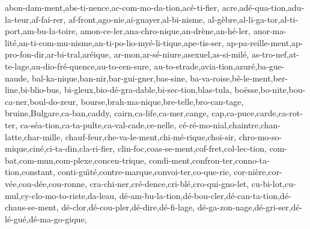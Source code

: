 %
%
abon-dam-ment,abs-ti-nence,ac-com-mo-da-tion,ac\'{e}-ti-fier,%
acre,ad\'{e}-qua-tion,adu-la-teur,af-fai-rer,%
af-front,ago-nie,ai-guayer,al-bi-nisme,%
al-g\`{e}bre,al-li-ga-tor,al-ti-port,am-bu-la-toire,%
amon-ce-ler,ana-chro-nique,an-dr\`{e}ne,an-h\'{e}-ler,%
anor-ma-lit\'{e},an-ti-com-mu-nisme,an-ti-po-lio-my\'{e}-li-tique,ape-tis-ser,%
ap-pa-reille-ment,ap-pro-fon-dir,ar-bi-tral,ar\'{e}ique,%
ar-mon,ar-s\'{e}-niure,asexuel,as-si-mil\'{e},%
as-tro-nef,at-te-lage,au-dio-fr\'{e}-quence,au-to-cen-sure,%
au-to-strade,avia-tion,azur\'{e},ba-gue-naude,%
bal-ka-nique,ban-nir,bar-gui-gner,bas-sine,%
ba-va-roise,b\^{e}-le-ment,ber-line,bi-blio-bus,%
bi-gleux,bio-d\'{e}-gra-dable,bi-sec-tion,blas-tula,%
bo\"{e}sse,bo-nite,bou-ca-ner,boul-do-zeur,%
bourse,brah-ma-nique,bre-telle,bro-can-tage,%
bruine,Bulgare,ca-ban,caddy,%
cairn,ca-life,ca-mer,cange,%
cap,ca-puce,carde,ca-rot-ter,%
ca-s\'{e}a-tion,ca-ta-pulte,ca-val-cade,ce-nelle,%
c\'{e}-r\'{e}-mo-nial,chaintre,chan-latte,char-mille,%
chauf-feur,che-va-le-ment,chi-m\'{e}-rique,choi-sir,%
chro-mo-so-mique,cin\'{e},ci-ta-din,cla-ri-fier,%
clin-foc,coas-se-ment,cof-fret,col-lec-tion,%
com-bat,com-mun,com-plexe,concen-trique,%
condi-ment,confron-ter,conno-ta-tion,constant,%
conti-gu\"{\i}t\'{e},contre-marque,convoi-ter,co-que-rie,%
cor-ni\`{e}re,cor-v\'{e}e,cou-d\'{e}e,cou-ronne,%
cra-chi-ner,cr\'{e}-dence,cri-bl\'{e},cro-qui-gno-let,%
cu-bi-lot,cu-mul,cy-clo-mo-to-riste,da-leau,%
d\'{e}-am-bu-la-tion,d\'{e}-bou-cler,d\'{e}-can-ta-tion,d\'{e}-chaus-se-ment,%
d\'{e}-clor,d\'{e}-cou-pler,d\'{e}-dire,d\'{e}-fi-lage,%
d\'{e}-ga-zon-nage,d\'{e}-gri-ser,d\'{e}-l\'{e}-gu\'{e},d\'{e}-ma-go-gique,%
